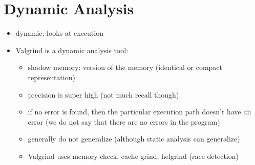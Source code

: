 \documentclass[twoside]{article}
\begin{document}
\section{Dynamic Analysis}
\begin{itemize}
	\item dynamic: looks at execution
	\item Valgrind is a dynamic analysis tool:
	\begin{itemize}
		\item shadow memory: version of the memory (identical or compact representation)
		\item precision is super high (not much recall though)
		\item if no error is found, then the particular execution path doesn't have an error (we do not say that there are no errors in the program)
		\item generally do not generalize (although static analysis can generalize)
		\item Valgrind uses memory check, cache grind, helgrind (race detection)
	\end{itemize}
\end{itemize}
\end{document}
